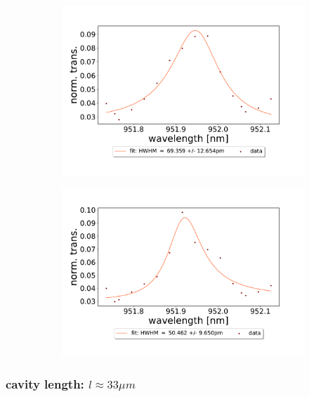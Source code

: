 \begin{figure}[h!]
\begin{subfigure}[b]{0.49\textwidth}
        \includegraphics[width=\textwidth]{figures/results/double fano fits/20250326/53um_M3:M5_fit_9.pdf}
        \caption{}
        \label{fig:53um_M3:M5_fit_9}
    \end{subfigure}
    \begin{subfigure}[b]{0.49\textwidth}
        \includegraphics[width=\textwidth]{figures/results/double fano fits/20250326/53um_M3:M5_fit_10.pdf}
        \caption{}
        \label{fig:53um_M3:M5_fit_10}
    \end{subfigure}
\end{figure}

\clearpage
\subsubsection*{cavity length: $l \approx 33 \mu m$}

